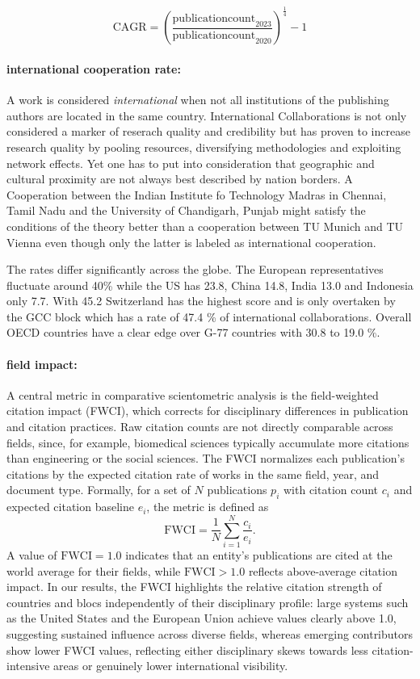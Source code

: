 \documentclass{article}
\begin{document}
\[
\text{CAGR} = \left(\frac{\text{publicationcount}_{2023}}{\text{publicationcount}_{2020}}\right)^{\tfrac{1}{4}} - 1
\]


\paragraph{international cooperation rate:} A work is considered \textit{international} when not all institutions of the publishing authors are located in the same country. International Collaborations is not only considered a marker of reserach quality and credibility but has proven to increase research quality by pooling resources, diversifying methodologies and exploiting network effects.  Yet one has to put into consideration that geographic and cultural proximity are not always best described by nation borders. A Cooperation between the Indian Institute fo Technology Madras in Chennai, Tamil Nadu and the University of Chandigarh, Punjab might satisfy the conditions of the theory better than a cooperation between TU Munich and TU Vienna even though only the latter is labeled as international cooperation.

The rates differ significantly across the globe. The European representatives fluctuate around 40\% while the US has 23.8, China 14.8, India 13.0 and Indonesia only 7.7. With 45.2 Switzerland has the highest score and is only overtaken by the GCC block which has a rate of 47.4 \% of international collaborations. Overall OECD countries have a clear edge over G-77 countries with 30.8 to 19.0 \%.

\paragraph{field impact:} A central metric in comparative scientometric analysis is the field-weighted citation impact (FWCI), which corrects for disciplinary differences in publication and citation practices. Raw citation counts are not directly comparable across fields, since, for example, biomedical sciences typically accumulate more citations than engineering or the social sciences. The FWCI normalizes each publication's citations by the expected citation rate of works in the same field, year, and document type. Formally, for a set of $N$ publications $p_i$ with citation count $c_i$ and expected citation baseline $e_i$, the metric is defined as
\[
\text{FWCI} = \frac{1}{N}\sum_{i=1}^{N}\frac{c_i}{e_i}.
\]
A value of $\text{FWCI}=1.0$ indicates that an entity's publications are cited at the world average for their fields, while $\text{FWCI}>1.0$ reflects above-average citation impact. In our results, the FWCI highlights the relative citation strength of countries and blocs independently of their disciplinary profile: large systems such as the United States and the European Union achieve values clearly above 1.0, suggesting sustained influence across diverse fields, whereas emerging contributors show lower FWCI values, reflecting either disciplinary skews towards less citation-intensive areas or genuinely lower international visibility.
\end{document}
